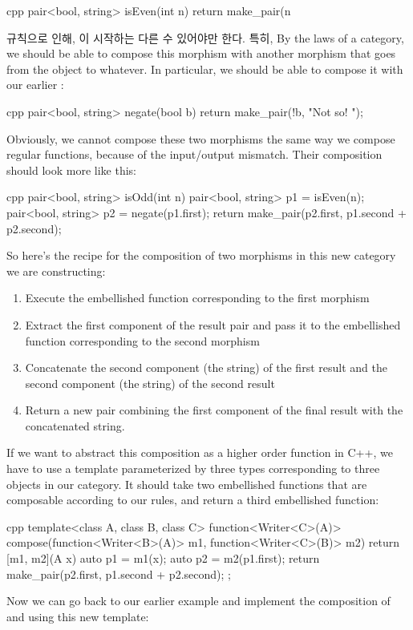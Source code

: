 \begin{snip}{cpp}
pair<bool, string> isEven(int n) {
    return make_pair(n %
}
\end{snip}
 규칙으로 인해, 이    시작하는 다른   수 있어야만 한다.
특히, 
By the laws of a category, we should be able to compose this morphism
with another morphism that goes from the object  to
whatever. In particular, we should be able to compose it with our
earlier :

\begin{snip}{cpp}
pair<bool, string> negate(bool b) {
    return make_pair(!b, "Not so! ");
}
\end{snip}
Obviously, we cannot compose these two morphisms the same way we compose
regular functions, because of the input/output mismatch. Their
composition should look more like this:

\begin{snip}{cpp}
pair<bool, string> isOdd(int n) {
    pair<bool, string> p1 = isEven(n);
    pair<bool, string> p2 = negate(p1.first);
    return make_pair(p2.first, p1.second + p2.second);
}
\end{snip}
So here's the recipe for the composition of two morphisms in this new
category we are constructing:

\begin{enumerate}
\tightlist
\item
  Execute the embellished function corresponding to the first morphism
\item
  Extract the first component of the result pair and pass it to the
  embellished function corresponding to the second morphism
\item
  Concatenate the second component (the string) of the first result
  and the second component (the string) of the second result
\item
  Return a new pair combining the first component of the final result
  with the concatenated string.
\end{enumerate}

If we want to abstract this composition as a higher order function in
C++, we have to use a template parameterized by three types
corresponding to three objects in our category. It should take two
embellished functions that are composable according to our rules, and
return a third embellished function:

\begin{snip}{cpp}
template<class A, class B, class C>
function<Writer<C>(A)> compose(function<Writer<B>(A)> m1,
                               function<Writer<C>(B)> m2)
{
    return [m1, m2](A x) {
        auto p1 = m1(x);
        auto p2 = m2(p1.first);
        return make_pair(p2.first, p1.second + p2.second); 
    };
}
\end{snip}
Now we can go back to our earlier example and implement the composition
of  and  using this new template:

